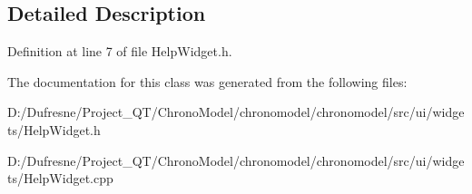 \subsection{Detailed Description}


Definition at line 7 of file Help\-Widget.\-h.



The documentation for this class was generated from the following files\-:\begin{DoxyCompactItemize}
\item 
D\-:/\-Dufresne/\-Project\-\_\-\-Q\-T/\-Chrono\-Model/chronomodel/chronomodel/src/ui/widgets/Help\-Widget.\-h\item 
D\-:/\-Dufresne/\-Project\-\_\-\-Q\-T/\-Chrono\-Model/chronomodel/chronomodel/src/ui/widgets/Help\-Widget.\-cpp\end{DoxyCompactItemize}
